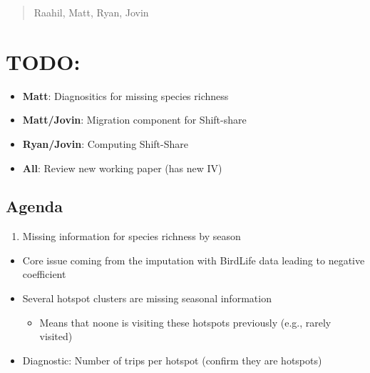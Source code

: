 \documentclass[
  letterpaper,
]{article}
\providecommand{\tightlist}{%
  \setlength{\itemsep}{0pt}\setlength{\parskip}{0pt}}\usepackage{longtable,booktabs,array}
\begin{document}
\begin{tcolorbox}[enhanced jigsaw, toptitle=1mm, toprule=.15mm, bottomrule=.15mm, leftrule=.75mm, opacityback=0, colframe=quarto-callout-note-color-frame, coltitle=black, left=2mm, rightrule=.15mm, titlerule=0mm, breakable, colback=white, bottomtitle=1mm, title=\textcolor{quarto-callout-note-color}{\faInfo}\hspace{0.5em}{9/12/2025}, opacitybacktitle=0.6, colbacktitle=quarto-callout-note-color!10!white, arc=.35mm]

\begin{quote}
Raahil, Matt, Ryan, Jovin
\end{quote}

\section{TODO:}\label{todo}

\begin{itemize}
\tightlist
\item
  \textbf{Matt}: Diagnositics for missing species richness
\item
  \textbf{Matt/Jovin}: Migration component for Shift-share
\item
  \textbf{Ryan/Jovin}: Computing Shift-Share
\item
  \textbf{All}: Review new working paper (has new IV)
\end{itemize}

\subsection{Agenda}\label{agenda}

\begin{enumerate}
\def\labelenumi{\arabic{enumi}.}
\tightlist
\item
  Missing information for species richness by season
\end{enumerate}

\begin{itemize}
\tightlist
\item
  Core issue coming from the imputation with BirdLife data leading to
  negative coefficient
\item
  Several hotspot clusters are missing seasonal information

  \begin{itemize}
  \tightlist
  \item
    Means that noone is visiting these hotspots previously (e.g., rarely
    visited)
  \end{itemize}
\item
  Diagnostic: Number of trips per hotspot (confirm they are hotspots)


\end{itemize}
\end{tcolorbox}
\end{document}
